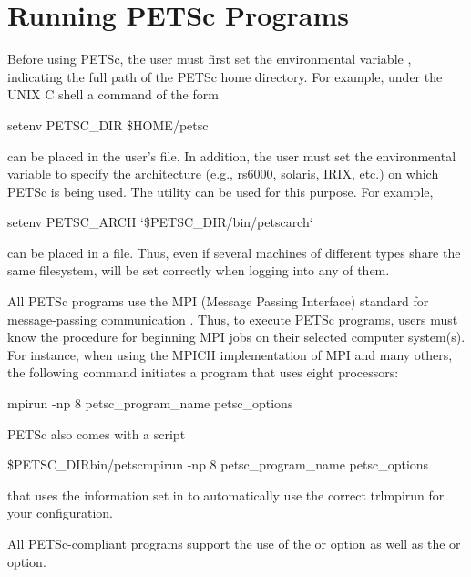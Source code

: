 \section{Running PETSc Programs}
\label{sec_running}

Before using PETSc, the user must first set the environmental variable
,  indicating the full path of the PETSc home
directory.  For example, under the UNIX C shell a command of the form
\begin{tabbing}
   setenv PETSC\_DIR \$HOME/petsc
\end{tabbing}
 can be placed in the user's  file.  In addition, the user must set the environmental
variable  to specify the architecture (e.g., rs6000,
solaris, IRIX, etc.)  on which PETSc is being used.  The utility
  can be used for this purpose.  For example,
\begin{tabbing}
   setenv PETSC\_ARCH `\$PETSC\_DIR/bin/petscarch`
\end{tabbing}
can be placed in a  file.  Thus, even if several machines of different
types share the same filesystem,  will be set correctly
when logging into any of them. 

All PETSc programs use the MPI (Message Passing Interface) standard
for message-passing communication \cite{MPI-final}.  Thus, to execute
PETSc programs, users must know the procedure for beginning MPI jobs
on their selected computer system(s).  For instance, when using the
MPICH implementation of MPI \cite{mpich-web-page} and many others, the following
command initiates a program that uses eight processors:
  
\begin{tabbing}
   mpirun -np 8 petsc\_program\_name petsc\_options
\end{tabbing}

PETSc also comes with a script 
\begin{tabbing}
   \${PETSC\_DIR}bin/petscmpirun -np 8 petsc\_program\_name petsc\_options
\end{tabbing}
that uses the information set in  to 
automatically use the correct trl{mpirun} for your configuration.

All PETSc-compliant programs support the use of the 
 or  option as well as the  
or  option. 


